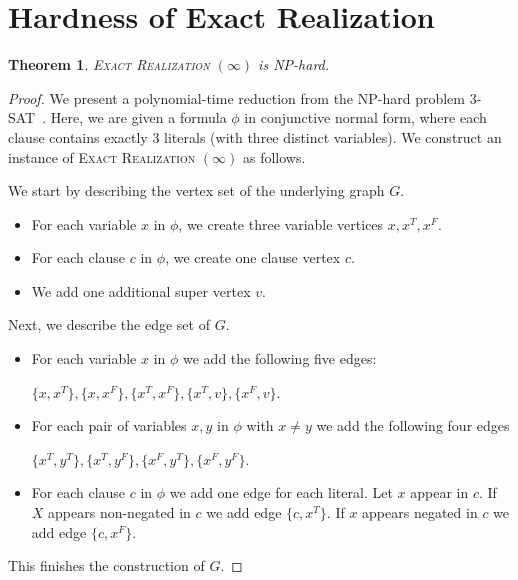 \documentclass[11pt,a4paper]{article}
\newtheorem{theorem}{Theorem}
\theoremstyle{remark}
\theoremstyle{definition}
\newcommand{\NP}{\textrm{NP}}
\begin{document}
    
\section{Hardness of Exact Realization}


\begin{theorem}
	\textsc{Exact Realization $(\infty)$} is \NP-hard.
\end{theorem}

\begin{proof}
	We present a polynomial-time reduction from the NP-hard problem 3-SAT~\cite{Karp1972Reducibility}. Here, we are given a formula $\phi$ in conjunctive normal form, where each clause contains exactly 3 literals (with three distinct variables). We construct an instance of \textsc{Exact Realization $(\infty)$} as follows.

 We start by describing the vertex set of the underlying graph $G$.
\begin{itemize}
\item For each variable $x$ in $\phi$, we create three variable vertices $x, x^T, x^F$.
\item For each clause $c$ in $\phi$, we create one clause vertex $c$.
\item We add one additional super vertex $v$.
\end{itemize}
Next, we describe the edge set of $G$.
\begin{itemize}
\item For each variable $x$ in $\phi$ we add the following five edges: 

$\{x, x^T\}, \{x, x^F\}, \{x^T, x^F\}, \{x^T, v\}, \{x^F,v\}$.
\item For each pair of variables $x,y$ in $\phi$ with $x\neq y$ we add the following four edges 

$\{x^T,y^T\},\{x^T,y^F\}, \{x^F,y^T\},\{x^F,y^F\}$.
\item For each clause $c$ in $\phi$ we add one edge for each literal. Let $x$ appear in $c$. If $X$ appears non-negated in $c$ we add edge $\{c,x^T\}$. If $x$ appears negated in $c$ we add edge $\{c, x^F\}$.
\end{itemize}
This finishes the construction of $G$.


\end{proof}
\end{document}
